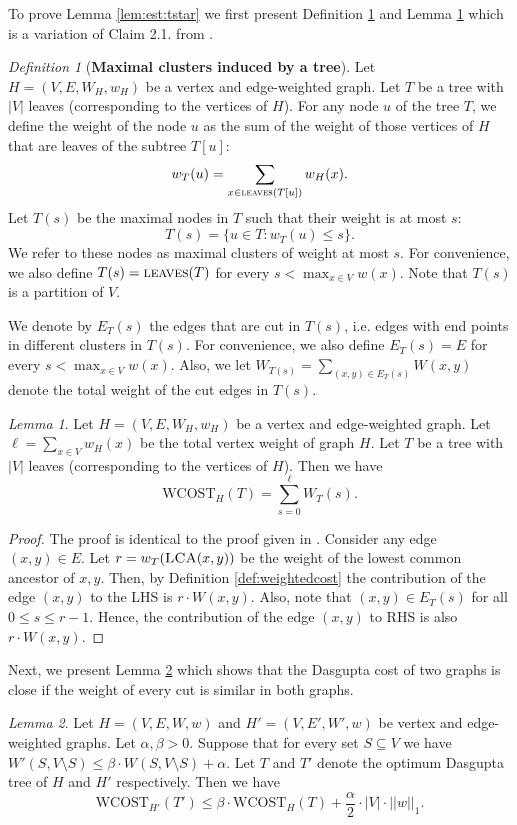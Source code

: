\documentclass[letterpaper,11pt]{article}
\newcommand{\lca}{\textsc{LCA}}
\newcommand{\wCT}{\text{WCOST}}
\newcommand{\lv}{\textsc{leaves}}
\theoremstyle{plain}
\theoremstyle{definition}
\theoremstyle{remark}
\newtheorem{lemmma}{Lemma}
\newtheorem{mydef}{Definition}
\begin{document}
To prove Lemma \ref{lem:est:tstar} we first present Definition \ref{def:maximal:clusters} and Lemma \ref{lem:cut-opt} which is a variation of Claim 2.1. from \cite{charikar2017approximate}.


\begin{mydef}[\textbf{Maximal clusters induced by a tree}] \label{def:maximal:clusters}
	Let $H=(V,E,W_H,w_H)$ be a vertex and edge-weighted graph. Let $T$ be a  tree with $|V|$ leaves (corresponding to the vertices of $H$). For any node $u$ of the tree $T$, we define the  weight of the node $u$ as the sum of the weight of those vertices of $H$ that are leaves of the subtree $T[u]$: \[ w_T(u)=\sum_{x\in \lv(T[u])} w_H(x) \text{.}\] 
Let $T(s)$ be the maximal nodes in $T$ such that their weight is at most $s$:
\[T(s) =\{u\in T: w_T(u)\leq s\} \text{.}\]
We refer to these nodes as maximal clusters of weight at most $s$. For convenience, we also define $T(s) =\lv(T)$ for every $s<\max_{x\in V} w(x)$.  Note that $T(s)$ is a partition of $V$.

We denote by $E_T(s)$ the edges that are cut in $T(s)$, i.e. edges with end points in different clusters in $T(s)$. For convenience, we also define $E_T(s) =E$ for every $s<\max_{x\in V} w(x)$. 
Also, we let $W_{T(s)}=\sum_{(x,y)\in E_T(s)} W(x,y)$ denote the total weight of the cut edges in $T(s)$. 
\end{mydef}




\begin{lemmma} \label{lem:cut-opt}
	Let $H=(V,E,W_H,w_H)$ be a vertex and edge-weighted graph. Let $\ell=\sum_{x\in V} w_H(x)$ be the total vertex weight of graph $H$. Let $T$ be a tree with $|V|$ leaves (corresponding to the vertices of $H$).  Then we have 
\[\wCT_{H}(T) = \sum_{s=0}^{\ell} W_T(s) \text{.}\]
\end{lemmma}

\begin{proof}
	The proof is identical to the proof given in \cite{charikar2017approximate}. Consider any edge $(x,y) \in E$.	
Let $r = w_T(\lca(x,y))$ be the weight of the lowest common ancestor of $x,y$. Then, by Definition \ref{def:weightedcost} the contribution of the edge $(x,y)$ to the LHS
	is $r \cdot W(x,y)$. Also, note that $(x,y) \in E_T(s)$ for all $0 \leq s \leq r-1$. Hence, the contribution of the edge $(x,y)$ to RHS is also $r \cdot W(x,y)$.
\end{proof}

Next, we present Lemma \ref{lem:cut-cost} which shows that the Dasgupta cost of two graphs is close if the weight of every cut is similar in both graphs.
\begin{lemmma}
	\label{lem:cut-cost}
	Let $H=(V,E, W, w)$ and $H'=(V, E', W', w)$ be vertex and edge-weighted graphs. Let $\alpha, \beta >0$. Suppose that for every set $S\subseteq V$ we have 
	$ W'(S,V\setminus S) \leq \beta \cdot W(S,V\setminus S) + \alpha$. Let $T$ and $T'$ denote the optimum Dasgupta tree of $H$ and 
	$H'$ respectively. Then we have
	\[ \wCT_{H'}(T') \leq \beta\cdot \wCT_{H}(T) + \frac{\alpha}{2} \cdot |V|\cdot ||w||_1 \text{.}\]
\end{lemmma}
\end{document}
